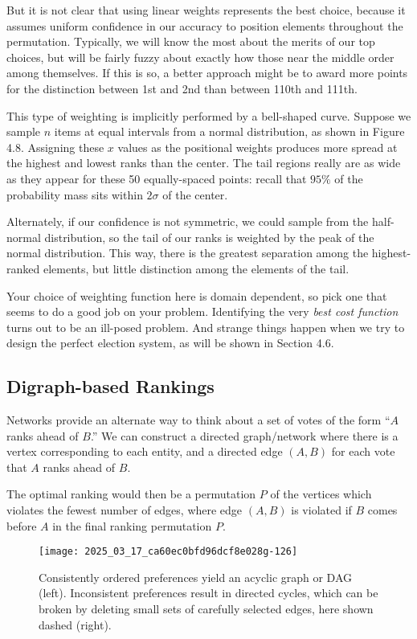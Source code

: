 \documentclass[10pt]{article}
\begin{document}
But it is not clear that using linear weights represents the best choice, because it assumes uniform confidence in our accuracy to position elements throughout the permutation. Typically, we will know the most about the merits of our top choices, but will be fairly fuzzy about exactly how those near the middle order among themselves. If this is so, a better approach might be to award more points for the distinction between 1st and 2nd than between 110th and 111th.

This type of weighting is implicitly performed by a bell-shaped curve. Suppose we sample $n$ items at equal intervals from a normal distribution, as shown in Figure 4.8. Assigning these $x$ values as the positional weights produces more spread at the highest and lowest ranks than the center. The tail regions really are as wide as they appear for these 50 equally-spaced points: recall that $95\%$ of the probability mass sits within $2\sigma$ of the center.

Alternately, if our confidence is not symmetric, we could sample from the half-normal distribution, so the tail of our ranks is weighted by the peak of the normal distribution. This way, there is the greatest separation among the highest-ranked elements, but little distinction among the elements of the tail.

Your choice of weighting function here is domain dependent, so pick one that seems to do a good job on your problem. Identifying the very \textit{best cost function} turns out to be an ill-posed problem. And strange things happen when we try to design the perfect election system, as will be shown in Section 4.6.

\subsection*{Digraph-based Rankings}
Networks provide an alternate way to think about a set of votes of the form “$A$ ranks ahead of $B$.” We can construct a directed graph/network where there is a vertex corresponding to each entity, and a directed edge $(A, B)$ for each vote that $A$ ranks ahead of $B$.

The optimal ranking would then be a permutation $P$ of the vertices which violates the fewest number of edges, where edge $(A, B)$ is violated if $B$ comes before $A$ in the final ranking permutation $P$.

\begin{figure}[h!]
    \centering
    \texttt{[image: 2025\_03\_17\_ca60ec0bfd96dcf8e028g-126]}
    \caption{Consistently ordered preferences yield an acyclic graph or DAG (left). Inconsistent preferences result in directed cycles, which can be broken by deleting small sets of carefully selected edges, here shown dashed (right).}
\end{figure}
\end{document}
